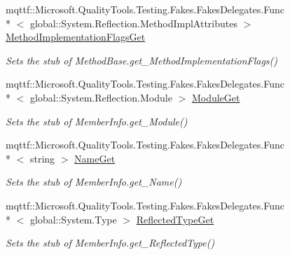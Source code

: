 \begin{DoxyCompactItemize}
mqttf\-::\-Microsoft.\-Quality\-Tools.\-Testing.\-Fakes.\-Fakes\-Delegates.\-Func\\*
$<$ global\-::\-System.\-Reflection.\-Method\-Impl\-Attributes $>$ \hyperlink{class_system_1_1_reflection_1_1_fakes_1_1_stub_constructor_info_aae566f8a614c0544ce8ffa37bfa1b68c}{Method\-Implementation\-Flags\-Get}
\begin{DoxyCompactList}\small\item\em Sets the stub of Method\-Base.\-get\-\_\-\-Method\-Implementation\-Flags()\end{DoxyCompactList}\item 
mqttf\-::\-Microsoft.\-Quality\-Tools.\-Testing.\-Fakes.\-Fakes\-Delegates.\-Func\\*
$<$ global\-::\-System.\-Reflection.\-Module $>$ \hyperlink{class_system_1_1_reflection_1_1_fakes_1_1_stub_constructor_info_a80fac9d293fdc2b2685bc8d0509dbe12}{Module\-Get}
\begin{DoxyCompactList}\small\item\em Sets the stub of Member\-Info.\-get\-\_\-\-Module()\end{DoxyCompactList}\item 
mqttf\-::\-Microsoft.\-Quality\-Tools.\-Testing.\-Fakes.\-Fakes\-Delegates.\-Func\\*
$<$ string $>$ \hyperlink{class_system_1_1_reflection_1_1_fakes_1_1_stub_constructor_info_a3cc80bd81c4e411cb8428f1244877668}{Name\-Get}
\begin{DoxyCompactList}\small\item\em Sets the stub of Member\-Info.\-get\-\_\-\-Name()\end{DoxyCompactList}\item 
mqttf\-::\-Microsoft.\-Quality\-Tools.\-Testing.\-Fakes.\-Fakes\-Delegates.\-Func\\*
$<$ global\-::\-System.\-Type $>$ \hyperlink{class_system_1_1_reflection_1_1_fakes_1_1_stub_constructor_info_aba098281b1978a3fcad330fa9feb7d7c}{Reflected\-Type\-Get}
\begin{DoxyCompactList}\small\item\em Sets the stub of Member\-Info.\-get\-\_\-\-Reflected\-Type()\end{DoxyCompactList}\end{DoxyCompactItemize}
